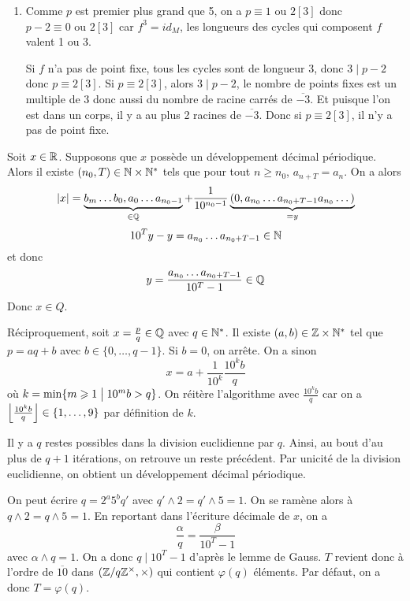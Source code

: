 \begin{solution}
\begin{enumerate}
		\item Comme $p$ est premier plus grand que 5, on a $p\equiv 1\text{ ou }2[3]$ donc $p-2\equiv 0\text{ ou }2[3]$ car $f^{3}=id_{M}$, les longueurs des cycles qui composent $f$ valent 1 ou 3. 
		
		Si $f$ n'a pas de point fixe, tous les cycles sont de longueur 3, donc $3\mid p-2$ donc $p\equiv 2[3]$. Si $p\equiv 2[3]$, alors $3\mid p-2$, le nombre de points fixes est un multiple de $3$ donc aussi du nombre de racine carrés de $\overline{-3}$. Et puisque l'on est dans un corps, il y a au plus 2 racines de $\overline{-3}$. Donc si $p\equiv2[3]$, il n'y a pas de point fixe.
	\end{enumerate}
\end{solution}

\begin{solution}
	Soit $x\in\mathbb{R}$. Supposons que $x$ possède un développement décimal périodique. Alors il existe $(n_{0},T)\in\mathbb{N}\times\mathbb{N}^{*}$ tels que pour tout $n\geqslant n_{0}$, $a_{n+T}=a_{n}$. On a alors 
	$$\vert x\vert=\underbrace{b_{m}\dots b_{0},a_{0}\dots a_{n_{0}-1}}_{\in\mathbb{Q}}+\frac{1}{10^{n_{0}-1}}\underbrace{(0,a_{n_{0}}\dots a_{n_{0}+T-1}a_{n_{0}}\dots)}_{=y}$$
	$$10^{T}y-y=a_{n_{0}}\dots a_{n_{0}+T-1}\in\mathbb{N}$$
	et donc 
	$$y=\frac{a_{n_{0}}\dots a_{n_{0}+T-1}}{10^{T}-1}\in\mathbb{Q}$$
	Donc $x\in Q$.

	Réciproquement, soit $x=\frac{p}{q}\in\mathbb{Q}$ avec $q\in\mathbb{N}^{*}$. Il existe $(a,b)\in\mathbb{Z}\times\mathbb{N}^{*}$ tel que $p=aq+b$ avec $b\in\{0,\dots,q-1\}$. Si $b=0$, on arrête. On a sinon 
	$$x=a+\frac{1}{10^{k}}\frac{10^{k}b}{q}$$
	où $k=\min\{m\geqslant1\bigm| 10^{m}b>q\}$.
	On réitère l'algorithme avec $\frac{10^{k}b}{q}$ car on a $\Bigl\lfloor\frac{10^{k}b}{q}\Bigr\rfloor\in\{1,\dots,9\}$ par définition de $k$.

	Il y a $q$ restes possibles dans la division euclidienne par $q$. Ainsi, au bout d'au plus de $q+1$ itérations, on retrouve un reste précédent. Par unicité de la division euclidienne, on obtient un développement décimal périodique.
\end{solution}

\begin{remark}
	On peut écrire $q=2^{a}5^{b}q'$ avec $q'\wedge 2=q'\wedge 5=1$. On se ramène alors à $q\wedge2=q\wedge5=1$. En reportant dans l'écriture décimale de $x$, on a 
	$$\frac{\alpha}{q}=\frac{\beta}{10^{T}-1}$$
	avec $\alpha\wedge q=1$. On a donc $q\mid 10^{T}-1$ d'après le lemme de Gauss. $T$ revient donc à l'ordre de $\overline{10}$ dans $(\mathbb{Z}/q\mathbb{Z}^{\times},\times)$ qui contient $\varphi(q)$ éléments. Par défaut, on a donc $T=\varphi(q)$.
\end{remark}

